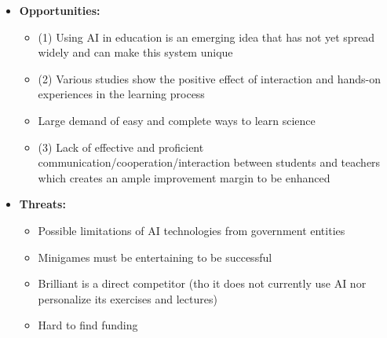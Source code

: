 \begin{itemize}
	\item \textbf{Opportunities:}
		\begin{itemize}
			\item (1) Using AI in education is an emerging idea that has not yet spread widely and can make this system unique
			\item (2) Various studies show the positive effect of interaction and hands-on experiences in the learning process
			\item Large demand of easy and complete ways to learn science
			\item (3) Lack of effective and proficient communication/cooperation/interaction between students and teachers which creates an ample improvement margin to be enhanced
		\end{itemize}
		
	\item \textbf{Threats:}
		\begin{itemize}
			\item Possible limitations of AI technologies from government entities
			\item Minigames must be entertaining to be successful
			\item Brilliant is a direct competitor (tho it does not currently use AI nor personalize its exercises and lectures)
			\item Hard to find funding
		\end{itemize}
\end{itemize}